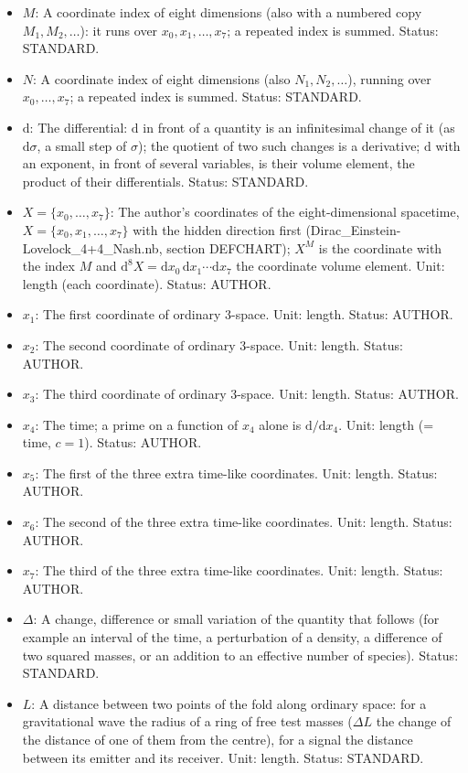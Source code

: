 \documentclass[
  10pt,
]{article}
\begin{document}
\begin{itemize}
  volume element). Unit: dimensionless. Status: AUTHOR.
\item
  \(M\): A coordinate index of eight dimensions (also with a numbered
  copy \(M_1, M_2, \dots\)): it runs over \(x_0, x_1, \dots, x_7\); a
  repeated index is summed. Status: STANDARD.
\item
  \(N\): A coordinate index of eight dimensions (also
  \(N_1, N_2, \dots\)), running over \(x_0, \dots, x_7\); a repeated
  index is summed. Status: STANDARD.
\item
  \(\mathrm{d}\): The differential: \(\mathrm{d}\) in front of a
  quantity is an infinitesimal change of it (as \(\mathrm{d}\sigma\), a
  small step of \(\sigma\)); the quotient of two such changes is a
  derivative; \(\mathrm{d}\) with an exponent, in front of several
  variables, is their volume element, the product of their
  differentials. Status: STANDARD.
\item
  \(X = \{x_0, \dots, x_7\}\): The author's coordinates of the
  eight-dimensional spacetime, \(X = \{x_0, x_1, \dots, x_7\}\) with the
  hidden direction first (Dirac\_Einstein-Lovelock\_4+4\_Nash.nb,
  section DEFCHART); \(X^M\) is the coordinate with the index \(M\) and
  \(\mathrm{d}^8X = \mathrm{d}x_0\,\mathrm{d}x_1\cdots\mathrm{d}x_7\)
  the coordinate volume element. Unit: length (each coordinate). Status:
  AUTHOR.
\item
  \(x_1\): The first coordinate of ordinary 3-space. Unit: length.
  Status: AUTHOR.
\item
  \(x_2\): The second coordinate of ordinary 3-space. Unit: length.
  Status: AUTHOR.
\item
  \(x_3\): The third coordinate of ordinary 3-space. Unit: length.
  Status: AUTHOR.
\item
  \(x_4\): The time; a prime on a function of \(x_4\) alone is
  \(\mathrm{d}/\mathrm{d}x_4\). Unit: length (= time, \(c = 1\)).
  Status: AUTHOR.
\item
  \(x_5\): The first of the three extra time-like coordinates. Unit:
  length. Status: AUTHOR.
\item
  \(x_6\): The second of the three extra time-like coordinates. Unit:
  length. Status: AUTHOR.
\item
  \(x_7\): The third of the three extra time-like coordinates. Unit:
  length. Status: AUTHOR.
\item
  \(\Delta\): A change, difference or small variation of the quantity
  that follows (for example an interval of the time, a perturbation of a
  density, a difference of two squared masses, or an addition to an
  effective number of species). Status: STANDARD.
\item
  \(L\): A distance between two points of the fold along ordinary space:
  for a gravitational wave the radius of a ring of free test masses
  (\(\Delta L\) the change of the distance of one of them from the
  centre), for a signal the distance between its emitter and its
  receiver. Unit: length. Status: STANDARD.
\end{itemize}
\end{document}
